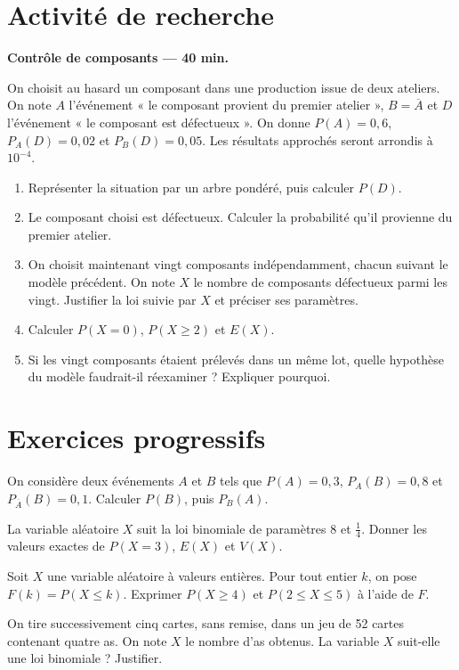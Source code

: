 \section{Activité de recherche}\textbf{Contrôle de composants --- 40 min.}\par On choisit au hasard un composant dans une production issue de deux ateliers. On note $A$ l'événement « le composant provient du premier atelier », $B=\overline A$ et $D$ l'événement « le composant est défectueux ». On donne $P(A)=0{,}6$, $P_A(D)=0{,}02$ et $P_B(D)=0{,}05$. Les résultats approchés seront arrondis à $10^{-4}$.
\begin{enumerate}\item Représenter la situation par un arbre pondéré, puis calculer $P(D)$.
\item Le composant choisi est défectueux. Calculer la probabilité qu'il provienne du premier atelier.
\item On choisit maintenant vingt composants indépendamment, chacun suivant le modèle précédent. On note $X$ le nombre de composants défectueux parmi les vingt. Justifier la loi suivie par $X$ et préciser ses paramètres.
\item Calculer $P(X=0)$, $P(X\ge2)$ et $E(X)$.
\item Si les vingt composants étaient prélevés dans un même lot, quelle hypothèse du modèle faudrait-il réexaminer ? Expliquer pourquoi.\end{enumerate}

\section{Exercices progressifs}

On considère deux événements $A$ et $B$ tels que $P(A)=0{,}3$, $P_A(B)=0{,}8$ et $P_{\overline A}(B)=0{,}1$. Calculer $P(B)$, puis $P_B(A)$.

La variable aléatoire $X$ suit la loi binomiale de paramètres $8$ et $\frac14$. Donner les valeurs exactes de $P(X=3)$, $E(X)$ et $V(X)$.

Soit $X$ une variable aléatoire à valeurs entières. Pour tout entier $k$, on pose $F(k)=P(X\le k)$. Exprimer $P(X\ge4)$ et $P(2\le X\le5)$ à l'aide de $F$.

On tire successivement cinq cartes, sans remise, dans un jeu de 52 cartes contenant quatre as. On note $X$ le nombre d'as obtenus. La variable $X$ suit-elle une loi binomiale ? Justifier.

